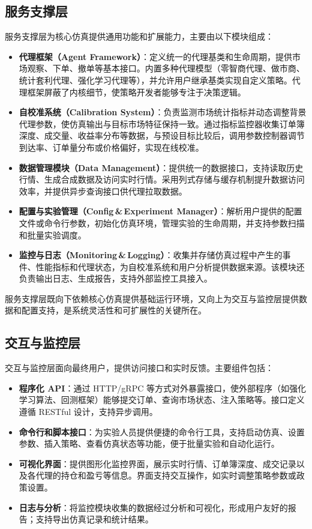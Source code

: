 \subsection{服务支撑层}

服务支撑层为核心仿真提供通用功能和扩展能力，主要由以下模块组成：

\begin{itemize}
  \item \textbf{代理框架（Agent Framework）}：定义统一的代理基类和生命周期，提供市场观察、下单、撤单等基本接口。内置多种代理模型（零智商代理、做市商、统计套利代理、强化学习代理等），并允许用户继承基类实现自定义策略。代理框架屏蔽了内核细节，使策略开发者能够专注于决策逻辑。
  \item \textbf{自校准系统（Calibration System）}：负责监测市场统计指标并动态调整背景代理参数，使仿真输出与目标市场特征保持一致。通过指标监控器收集订单簿深度、成交量、收益率分布等数据，与预设目标比较后，调用参数控制器调节到达率、订单量分布或价格偏好，实现在线校准。
  \item \textbf{数据管理模块（Data Management）}：提供统一的数据接口，支持读取历史行情、生成合成数据及访问实时行情。采用列式存储与缓存机制提升数据访问效率，并提供异步查询接口供代理拉取数据。
  \item \textbf{配置与实验管理（Config\,&\,Experiment Manager）}：解析用户提供的配置文件或命令行参数，初始化仿真环境，管理实验的生命周期，并支持参数扫描和批量实验调度。
  \item \textbf{监控与日志（Monitoring\,&\,Logging）}：收集并存储仿真过程中产生的事件、性能指标和代理状态，为自校准系统和用户分析提供数据来源。该模块还负责输出日志、生成报告，支持外部监控工具接入。
\end{itemize}

服务支撑层既向下依赖核心仿真提供基础运行环境，又向上为交互与监控层提供数据和配置支持，是系统灵活性和可扩展性的关键所在。

\subsection{交互与监控层}

交互与监控层面向最终用户，提供访问接口和实时反馈。主要组件包括：

\begin{itemize}
  \item \textbf{程序化 API}：通过 HTTP/gRPC 等方式对外暴露接口，使外部程序（如强化学习算法、回测框架）能够提交订单、查询市场状态、注入策略等。接口定义遵循 RESTful 设计，支持异步调用。
  \item \textbf{命令行和脚本接口}：为实验人员提供便捷的命令行工具，支持启动仿真、设置参数、插入策略、查看仿真状态等功能，便于批量实验和自动化运行。
  \item \textbf{可视化界面}：提供图形化监控界面，展示实时行情、订单簿深度、成交记录以及各代理的持仓和盈亏等信息。界面支持交互操作，如实时调整策略参数或政策设置。
  \item \textbf{日志与分析}：将监控模块收集的数据经过分析和可视化，形成用户友好的报告；支持导出仿真记录和统计结果。
\end{itemize}

